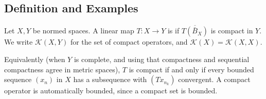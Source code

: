 \documentclass[a4paper]{scrartcl}
\newcommand{\Kop}{\mathcal{K}}
\begin{document}
\subsection{Definition and Examples}

\begin{definition}
	Let $X, Y$ be normed spaces. A linear map $T : X \to Y$ is  if $\overline{T(\bar B_X)}$ is compact in $Y$. We write $\Kop(X,Y)$ for the set of compact operators, and $\Kop(X)=\Kop(X,X)$.
\end{definition}

Equivalently (when $Y$ is complete, and using that compactness and sequential compactness agree in metric spaces), $T$ is compact if and only if every bounded sequence $(x_n)$ in $X$ has a subsequence with $(Tx_{n_k})$ convergent. A compact operator is automatically bounded, since a compact set is bounded.

\begin{center}
\end{center}
\end{document}
